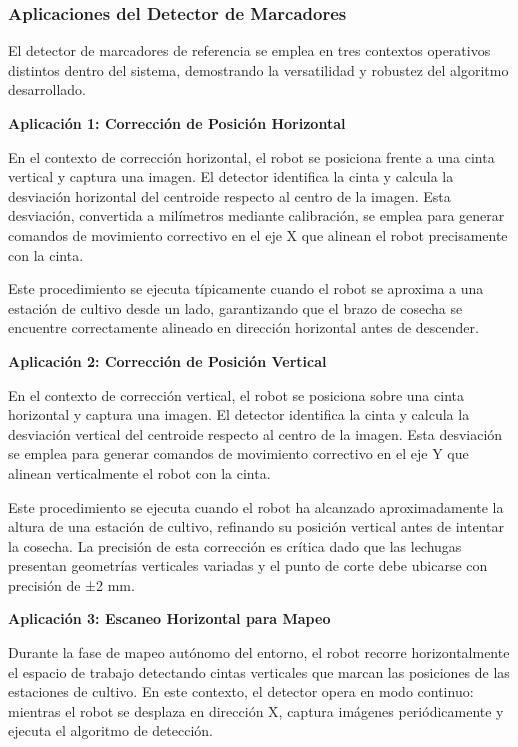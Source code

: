 \subsubsection{Aplicaciones del Detector de Marcadores}

El detector de marcadores de referencia se emplea en tres contextos operativos distintos dentro del sistema, demostrando la versatilidad y robustez del algoritmo desarrollado.

\textbf{Aplicación 1: Corrección de Posición Horizontal}

En el contexto de corrección horizontal, el robot se posiciona frente a una cinta vertical y captura una imagen. El detector identifica la cinta y calcula la desviación horizontal del centroide respecto al centro de la imagen. Esta desviación, convertida a milímetros mediante calibración, se emplea para generar comandos de movimiento correctivo en el eje X que alinean el robot precisamente con la cinta.

Este procedimiento se ejecuta típicamente cuando el robot se aproxima a una estación de cultivo desde un lado, garantizando que el brazo de cosecha se encuentre correctamente alineado en dirección horizontal antes de descender.

\textbf{Aplicación 2: Corrección de Posición Vertical}

En el contexto de corrección vertical, el robot se posiciona sobre una cinta horizontal y captura una imagen. El detector identifica la cinta y calcula la desviación vertical del centroide respecto al centro de la imagen. Esta desviación se emplea para generar comandos de movimiento correctivo en el eje Y que alinean verticalmente el robot con la cinta.

Este procedimiento se ejecuta cuando el robot ha alcanzado aproximadamente la altura de una estación de cultivo, refinando su posición vertical antes de intentar la cosecha. La precisión de esta corrección es crítica dado que las lechugas presentan geometrías verticales variadas y el punto de corte debe ubicarse con precisión de ±2 mm.

\textbf{Aplicación 3: Escaneo Horizontal para Mapeo}

Durante la fase de mapeo autónomo del entorno, el robot recorre horizontalmente el espacio de trabajo detectando cintas verticales que marcan las posiciones de las estaciones de cultivo. En este contexto, el detector opera en modo continuo: mientras el robot se desplaza en dirección X, captura imágenes periódicamente y ejecuta el algoritmo de detección.

